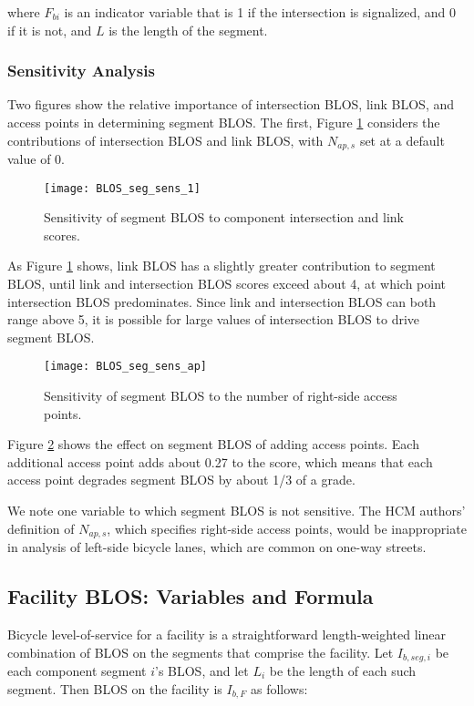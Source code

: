 \documentclass[11pt]{article} %
\begin{document}
where $F_{bi}$ is an indicator variable that is 1 if the intersection is signalized, and 0 if it is not, and $L$ is the length of the segment.

\subsubsection{Sensitivity Analysis}
Two figures show the relative importance of intersection BLOS, link BLOS, and access points in determining segment BLOS. The first, Figure \ref{fig:BLOS_seg_sens_1} considers the contributions of intersection BLOS and link BLOS, with $N_{ap,s}$ set at a default value of 0.

\begin{figure}
\centering
\texttt{[image: BLOS\_seg\_sens\_1]}
\caption{Sensitivity of segment BLOS to component intersection and link scores.}
\label{fig:BLOS_seg_sens_1}
\end{figure}



As Figure \ref{fig:BLOS_seg_sens_1} shows, link BLOS has a slightly greater contribution to segment BLOS, until link and intersection BLOS scores exceed about 4, at which point intersection BLOS predominates. Since link and intersection BLOS can both range above 5, it is possible for large values of intersection BLOS to drive segment BLOS. 


\begin{figure}
\centering
\texttt{[image: BLOS\_seg\_sens\_ap]}
\caption{Sensitivity of segment BLOS to the number of right-side access points.}
\label{fig:BLOS_seg_sens_ap}
\end{figure}


Figure \ref{fig:BLOS_seg_sens_ap} shows the effect on segment BLOS of adding access points. Each additional access point adds about 0.27 to the score, which means that each access point degrades segment BLOS by about 1/3 of a grade.

We note one variable to which segment BLOS is not sensitive. The HCM authors' definition of $N_{ap,s}$, which specifies right-side access points, would be inappropriate in analysis of left-side bicycle lanes, which are common on one-way streets.

\subsection{Facility BLOS: Variables and Formula}
Bicycle level-of-service for a facility is a straightforward length-weighted linear combination of BLOS on the segments that comprise the facility. Let $I_{b,seg,i}$ be each component segment $i$'s BLOS, and let $L_i$ be the length of each such segment. Then BLOS on the facility is $I_{b,F}$ as follows:
\end{document}
